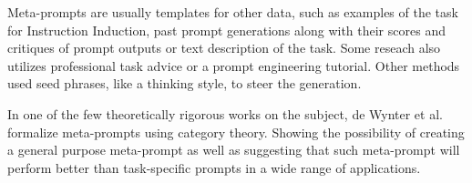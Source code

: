 Meta-prompts are usually templates for other data, such as examples of the task for Instruction Induction\cite{honovich2022instructioninductionexamplesnatural},
past prompt generations along with their scores\cite{yang2024largelanguagemodelsoptimizers} and critiques of prompt outputs\cite{he2024crispomultiaspectcritiquesuggestionguidedautomatic}
or text description of the task\cite{ye2024promptengineeringpromptengineer}. Some reseach also utilizes professional task advice\cite{ramnath2025systematicsurveyautomaticprompt}
or a prompt engineering tutorial\cite{ye2024promptengineeringpromptengineer}. Other methods used seed phrases, like a thinking 
style\cite{fernando2023promptbreederselfreferentialselfimprovementprompt}, to steer the generation.

In one of the few theoretically rigorous works on the subject, de Wynter et al.\cite{dewynter2024metaprompting} formalize meta-prompts
using category theory. Showing the possibility of creating a general purpose meta-prompt as well as suggesting that such meta-prompt
will perform better than task-specific prompts in a wide range of applications.